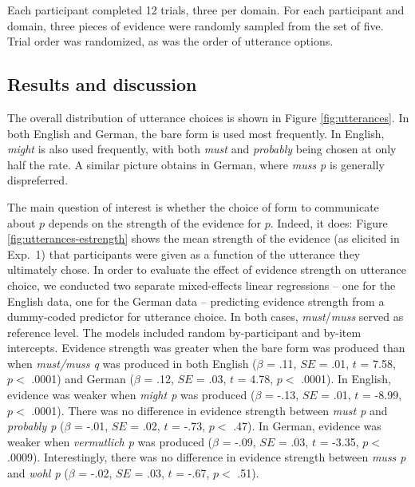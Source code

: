 \documentclass[11pt]{article}
\newcommand{\figref}[1]{Figure \ref{#1}}
\begin{document}
Each participant completed 12 trials, three per domain. For each participant and domain, three pieces of evidence were randomly sampled from the set of five. Trial order was randomized, as was the order of utterance options.


\subsection{Results and discussion}

The overall distribution of utterance choices is shown in \figref{fig:utterances}. In both English and German, the bare form is used most frequently. In English, \emph{might} is also used frequently, with both \emph{must} and \emph{probably} being chosen at only half the rate. A similar picture obtains in German, where \emph{muss p} is generally dispreferred.

The main question of interest  is whether the choice of form to communicate about $p$ depends on the strength of the evidence for $p$. Indeed, it does: \figref{fig:utterances-estrength} shows the mean strength of the evidence (as elicited in Exp.~1) that participants were given as a function of the utterance they ultimately chose.   In order to evaluate the effect of evidence strength on utterance choice, we conducted two separate mixed-effects linear regressions -- one for the English data, one for the German data -- predicting evidence strength from a dummy-coded predictor for utterance choice. In both cases, \emph{must}/\emph{muss} served as reference level. The models included random by-participant and by-item  intercepts. Evidence strength was greater when the bare form was produced than when \emph{must/muss q} was produced in both English ($\beta$ = .11, $SE$ = .01, $t$ = 7.58, $p <$ .0001) and German ($\beta$ = .12, $SE$ = .03, $t$ = 4.78, $p <$ .0001). In English, evidence   was weaker  when \emph{might p} was produced  ($\beta$ = -.13, $SE$ = .01, $t$ = -8.99, $p <$ .0001). There was no difference in evidence strength between \emph{must p} and \emph{probably p}  ($\beta$ = -.01, $SE$ = .02, $t$ = -.73, $p <$ .47). In German, evidence was weaker when \emph{vermutlich p} was produced  ($\beta$ = -.09, $SE$ = .03, $t$ = -3.35, $p <$ .0009). Interestingly, there was no difference in evidence strength between \emph{muss p} and \emph{wohl p}  ($\beta$ = -.02, $SE$ = .03, $t$ = -.67, $p <$ .51).
\end{document}
